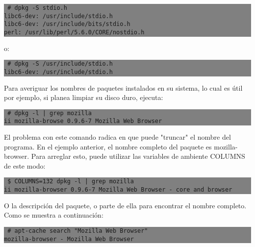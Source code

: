 \documentclass[12pt]{article}
\begin{document}
\colorbox{grey}{\parbox[t]{0.95\linewidth}{ \vspace*{0.5cm} {\tt
     \# dpkg -S stdio.h\\
     libc6-dev: /usr/include/stdio.h\\
     libc6-dev: /usr/include/bits/stdio.h\\
     perl: /usr/lib/perl/5.6.0/CORE/nostdio.h\\
 } \vspace*{0.5cm} } } 

o:

\colorbox{grey}{\parbox[t]{0.95\linewidth}{ \vspace*{0.5cm} {\tt
     \# dpkg -S /usr/include/stdio.h \\
     libc6-dev: /usr/include/stdio.h \\
 } \vspace*{0.5cm} } } 

Para averiguar los nombres de paquetes instalados en su sistema, lo cual es útil por ejemplo, si planea limpiar su disco duro, ejecuta:

\colorbox{grey}{\parbox[t]{0.95\linewidth}{ \vspace*{0.5cm} {\tt
     \# dpkg -l | grep mozilla \\
     ii  mozilla-browse 0.9.6-7        Mozilla Web Browser \\
 } \vspace*{0.5cm} } } 

El problema con este comando radica en que puede "truncar" el nombre del programa. En el ejemplo anterior, el nombre completo del paquete es mozilla-browser. Para arreglar esto, puede utilizar las variables de ambiente COLUMNS de este modo:

\colorbox{grey}{\parbox[t]{0.95\linewidth}{ \vspace*{0.5cm} {\tt
     \$ COLUMNS=132 dpkg -l | grep mozilla \\
     ii  mozilla-browser             0.9.6-7                     Mozilla Web Browser - core and browser \\
 } \vspace*{0.5cm} } } 

O la descripción del paquete, o parte de ella para encontrar el nombre completo. Como se muestra a continuación:

\colorbox{grey}{\parbox[t]{0.95\linewidth}{ \vspace*{0.5cm} {\tt
     \# apt-cache search "Mozilla Web Browser" \\
     mozilla-browser - Mozilla Web Browser \\
 } \vspace*{0.5cm} } } 
\end{document}
